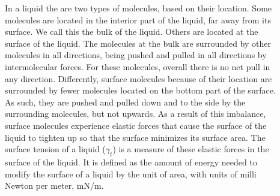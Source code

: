 \documentclass[main.tex]{subfiles}
\newcommand\chapterlabel{solids}
\begin{document}
\begin{description}
\item[] In a liquid the are two types of molecules, based on their location. Some molecules are located in the interior part of the liquid, far away from its surface. We call this the bulk of the liquid. Others are located at the surface of the liquid. The molecules at the bulk are surrounded by other molecules in all directions, being pushed and pulled in all directions by intermolecular forces. For these molecules, overall there is no net pull in any direction. Differently, surface molecules because of their location are surrounded by fewer molecules located on the bottom part of the surface. As such, they are pushed and pulled down and to the side by the surrounding molecules, but not upwards. As a result of this imbalance, surface molecules experience elastic forces that cause the surface of the liquid to tighten up so that the surface minimizes its surface area. The surface tension of a liquid ($\gamma_t$) is a measure of these elastic forces in the surface of the liquid. It is defined as the amount of energy needed to modify the surface of a liquid by the unit of area, with units of milli Newton per meter, mN/m.
\vspace{-0cm}
     \label{Fig:{\chapterlabel}\thefigurenewcounter}
     \begin{center}
     
     
 \resizebox{0.4\textwidth}{!}{%
\begin{tikzpicture} 
   

\end{tikzpicture}}
\end{center}
\end{description}
\end{document}
